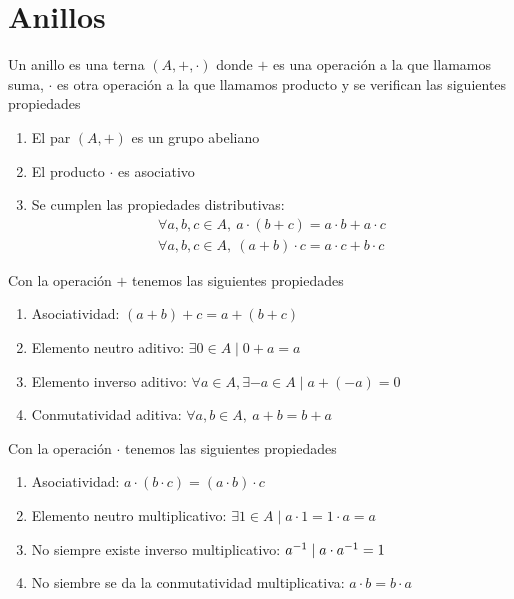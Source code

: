 
\chapter{Anillos}


\begin{dfn}[Anillo]
	Un anillo es una terna $(A, +, \cdot)$ donde $+$ es una operación a la que llamamos suma, $\cdot$ es otra operación a la que llamamos producto y se verifican las siguientes propiedades
	\begin{enumerate}
		\item El par $(A, +)$ es un grupo abeliano
		\item El producto $\cdot$ es asociativo
		\item Se cumplen las propiedades distributivas:
		\begin{align}
			\forall a, b , c \in A,\ a\cdot (b + c) = a\cdot b + a \cdot c \\
			\forall a, b , c \in A,\ (a + b) \cdot c = a\cdot c + b \cdot c
		\end{align}
	\end{enumerate}
\end{dfn}

Con la operación $+$ tenemos las siguientes propiedades
\begin{enumerate}
	\item Asociatividad: $(a+b)+c = a+(b+c)$
	\item Elemento neutro aditivo: $\exists 0 \in A \mid 0+a = a$
	\item Elemento inverso aditivo: $\forall a \in A, \exists -a \in A \mid a + (-a) = 0$
	\item Conmutatividad aditiva: $\forall a, b \in A,\ a+b = b+a$
\end{enumerate}

Con la operación $\cdot$ tenemos las siguientes propiedades
\begin{enumerate}
	\item Asociatividad: $a\cdot (b \cdot c) = (a \cdot b) \cdot c$
	\item Elemento neutro multiplicativo: $\exists 1 \in A \mid a\cdot 1 = 1 \cdot a = a$
	\item No siempre existe inverso multiplicativo: $a^{-1} \mid a\cdot a^{-1} = 1$
	\item No siembre se da la conmutatividad multiplicativa: $a \cdot b = b\cdot a$
\end{enumerate}

